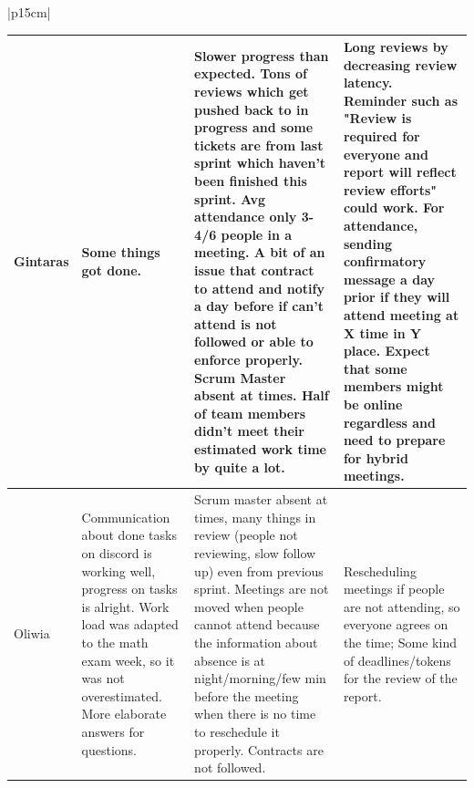 \begin{table}[H]
    \centering
    \begin{tabular}{|p{15cm}|} 
        \hline
        \begin{table}[H]
            \begin{tabular}{|p{1.75cm}|p{4cm}|p{4cm}|p{4cm}|}
                \hline
                \cellcolor[HTML]{d4d4d4} Gintaras & Some things got done. & Slower progress than expected. Tons of reviews which get pushed back to in progress and some tickets are from last sprint which haven't been finished this sprint. Avg attendance only 3-4/6 people in a meeting. A bit of an issue that contract to attend and notify a day before if can't attend is not followed or able to enforce properly. Scrum Master absent at times. Half of team members didn't meet their estimated work time by quite a lot. & Long reviews by decreasing review latency. Reminder such as "Review is required for everyone and report will reflect review efforts" could work. For attendance, sending confirmatory message a day prior if they will attend meeting at X time in Y place. Expect that some members might be online regardless and need to prepare for hybrid meetings. \\
                \hline
                \cellcolor[HTML]{d4d4d4} Oliwia & Communication about done tasks on discord is working well, progress on tasks is alright. Work load was adapted to the math exam week, so it was not overestimated. More elaborate answers for questions. & Scrum master absent at times, many things in review (people not reviewing, slow follow up) even from previous sprint. Meetings are not moved when people cannot attend because the information about absence is at night/morning/few min before the meeting when there is no time to reschedule it properly. Contracts are not followed. & Rescheduling meetings if people are not attending, so everyone agrees on the time; Some kind of deadlines/tokens for the review of the report. \\
                \hline
            \end{tabular}
        \end{table}
        \\
        \hline
    \end{tabular}
\end{table}

